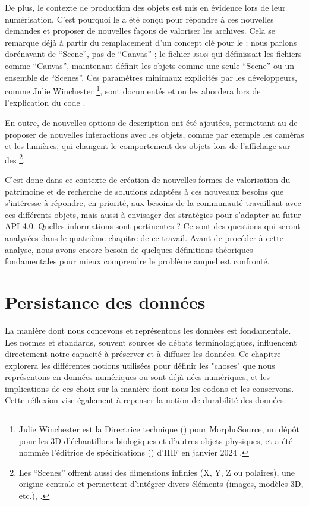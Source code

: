     De plus, le contexte de production des objets est mis en évidence lors de leur numérisation. C'est pourquoi le \papiq a été conçu pour répondre à ces nouvelles demandes et proposer de nouvelles façons de valoriser les archives. Cela se remarque déjà à partir du remplacement d'un concept clé pour le \papit : nous parlons dorénavant de \enquote{Scene}, pas de \enquote{Canvas} ; le fichier \textsc{json} qui définissait les fichiers comme \enquote{Canvas}, maintenant définit les objets comme une seule \enquote{Scene} ou un ensemble de \enquote{Scenes}. Ces paramètres minimaux explicités par les développeurs, comme Julie Winchester \footnote{Julie Winchester est la Directrice technique () pour MorphoSource, un dépôt pour les  3D d'échantillons biologiques et d'autres objets physiques, et a été nommée l'éditrice de spécifications () d'IIIF en janvier 2024 \cite{iiifjulie2024}.}, sont documentés et on les abordera lors de l'explication du code \diiif.

    En outre, de nouvelles options de description ont été ajoutées, permettant au \papiq de proposer de nouvelles interactions avec les objets, comme par exemple les caméras et les lumières, qui changent le comportement des objets lors de l'affichage sur des  \footnote{Les \enquote{Scenes} offrent aussi des dimensions infinies (X, Y, Z ou polaires), une origine centrale et permettent d'intégrer divers éléments (images, modèles 3D, etc.), \cite[p.~64]{ioannides_patias_2023}.}.

    C'est donc dans ce contexte de création de nouvelles formes de valorisation du patrimoine et de recherche de solutions adaptées à ces nouveaux besoins que \dsc s'intéresse à répondre, en priorité, aux besoins de la communauté travaillant avec ces différents objets, mais aussi à envisager des stratégies pour s'adapter au futur API 4.0. Quelles informations sont pertinentes ? Ce sont des questions qui seront analysées dans le quatrième chapitre de ce travail. Avant de procéder à cette analyse, nous avons encore besoin de quelques définitions théoriques fondamentales pour mieux comprendre le problème auquel \dsc est confronté.

\chapter{Persistance des données}

La manière dont nous concevons et représentons les données est fondamentale. Les normes et standards, souvent sources de débats terminologiques, influencent directement notre capacité à préserver et à diffuser les données. Ce chapitre explorera les différentes notions utilisées pour définir les "choses" que nous représentons en données numériques ou sont déjà nées numériques, et les implications de ces choix sur la manière dont nous les codons et les conservons. Cette réflexion vise également à repenser la notion de durabilité des données. 
    

